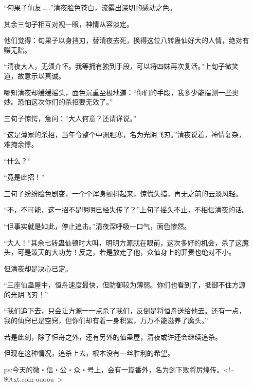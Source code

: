 \begin{this_body}
“旬果子仙友……”清夜脸色苍白，流露出深切的感动之色。

其余三旬子相互对视一眼，神情从容淡定。

他们觉得：旬果子以身挡刃，替清夜去死，换得这位八转蛊仙好大的人情，绝对有赚无赔。

“清夜大人，无须介怀。我等拥有独到手段，可以将四妹再次复活。”上旬子微笑道，故意示以真诚。

哪知清夜却缓缓摇头，面色沉重至极地道：“你们的手段，我多少能揣测一些奥妙。恐怕这次你们的杀招要无效了。”

三旬子惊愕，急问：“大人何意？还请详说。”

“这是薄家的杀招，当年令整个中洲胆寒，名为光阴飞刃。”清夜说着，神情复杂，难掩余悸。

“什么？”

“竟是此招！”

三旬子纷纷脸色剧变，一个个浑身颤抖起来，惊慌失措，再无之前的云淡风轻。

“不，不可能，这一招不是明明已经失传了？”上旬子摇头不止，不相信清夜的话。

“但事实就是如此，停止追击。”清夜深呼吸一口气，面色惨然。

“大人！”其余七转蛊仙顿时大叫，明明方源就在眼前，这次多好的机会，杀了这魔头，可是泼天的大功劳！反之，若是放走了他，众仙身上的罪责也绝对不小。

但清夜却是决心已定。

“三座仙蛊屋中，恒舟速度最快，但防御较为薄弱。你们也看到了，抵御不住方源的光阴飞刃！”

“我们追下去，只会让方源一一点杀了我们，反倒是将恒舟送给他去。还有一点，我的仙窍已是空窍，但你们却有着一身积累，万万不能滋养了魔头。”

若是此刻，除了恒舟之外，还有另外的仙蛊屋，清夜或许还会继续追杀。

但现在这种情况，追杀上去，根本没有一丝胜利的希望。

ps:今天的微・信・公・众・号上，会有一篇番外，名为剑下败将厉煌传。<!--80txt.com-ouoou-->

\end{this_body}

